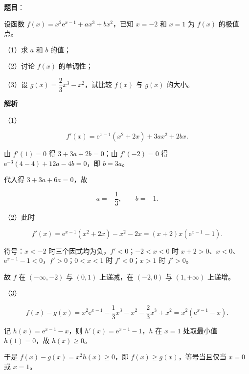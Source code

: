 \begin{answer}

\textbf{题目}：

设函数 $f(x)=x^2\mathrm e^{x-1}+ax^3+bx^2$，已知 $x=-2$ 和 $x=1$ 为 $f(x)$ 的极值点。

（1）求 $a$ 和 $b$ 的值；

（2）讨论 $f(x)$ 的单调性；

（3）设 $g(x)=\dfrac23x^3-x^2$，试比较 $f(x)$ 与 $g(x)$ 的大小。

\textbf{解析}

（1）

\nopagebreak[4]
\[f'(x)=\mathrm e^{x-1}\left(x^2+2x\right)+3ax^2+2bx.\]

由 $f'(1)=0$ 得 $3+3a+2b=0$；由 $f'(-2)=0$ 得 $\mathrm e^{-3}(4-4)+12a-4b=0$，即 $b=3a$。

代入得 $3+3a+6a=0$，故

\nopagebreak[4]
\[a=-\frac13,\qquad b=-1.\]

（2）此时

\nopagebreak[4]
\[f'(x)=\mathrm e^{x-1}\left(x^2+2x\right)-x^2-2x=(x+2)x\left(\mathrm e^{x-1}-1\right).\]

符号：$x<-2$ 时三个因式均为负，$f'<0$；$-2<x<0$ 时 $x+2>0$、$x<0$、$\mathrm e^{x-1}-1<0$，$f'>0$；$0<x<1$ 时 $f'<0$；$x>1$ 时 $f'>0$。

故 $f$ 在 $(-\infty,-2)$ 与 $(0,1)$ 上递减，在 $(-2,0)$ 与 $(1,+\infty)$ 上递增。

（3）

\nopagebreak[4]
\[f(x)-g(x)=x^2\mathrm e^{x-1}-\frac13x^3-x^2-\frac23x^3+x^2=x^2\left(\mathrm e^{x-1}-x\right).\]

记 $h(x)=\mathrm e^{x-1}-x$，则 $h'(x)=\mathrm e^{x-1}-1$，$h$ 在 $x=1$ 处取最小值 $h(1)=0$，故 $h(x)\geqslant0$。

于是 $f(x)-g(x)=x^2h(x)\geqslant0$，即 $f(x)\geqslant g(x)$，等号当且仅当 $x=0$ 或 $x=1$。


\end{answer}
